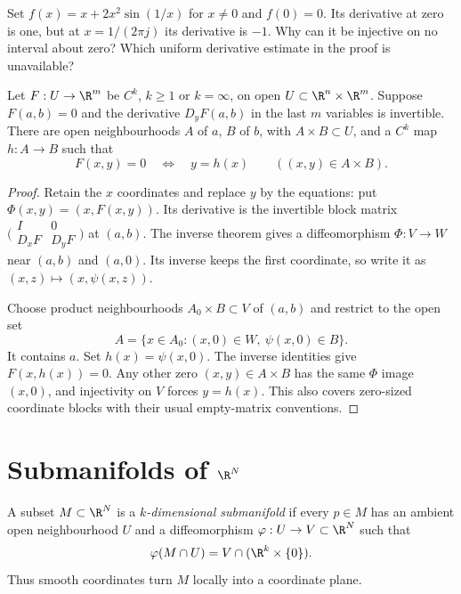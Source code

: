 \begin{think}
Set $f(x)=x+2x^2\sin(1/x)$ for $x\ne0$ and $f(0)=0$. Its derivative at zero is one, but at $x=1/(2\pi j)$ its derivative is $-1$. Why can it be injective on no interval about zero? Which uniform derivative estimate in the proof is unavailable?
\end{think}

\begin{theorem}\label{thm:implicit}
Let $F:U\to\R^m$ be $C^k$, $k\ge1$ or $k=\infty$, on open $U\subset\R^n\times\R^m$. Suppose $F(a,b)=0$ and the derivative $D_yF(a,b)$ in the last $m$ variables is invertible. There are open neighbourhoods $A$ of $a$, $B$ of $b$, with $A\times B\subset U$, and a $C^k$ map $h:A\to B$ such that
\[
F(x,y)=0\quad\Longleftrightarrow\quad y=h(x)\qquad((x,y)\in A\times B).
\]
\end{theorem}
\begin{proof}
Retain the $x$ coordinates and replace $y$ by the equations: put $\Phi(x,y)=(x,F(x,y))$. Its derivative is the invertible block matrix
$\bigl(\begin{smallmatrix}I&0\\D_xF&D_yF\end{smallmatrix}\bigr)$ at $(a,b)$. The inverse theorem gives a diffeomorphism $\Phi:V\to W$ near $(a,b)$ and $(a,0)$. Its inverse keeps the first coordinate, so write it as $(x,z)\mapsto(x,\psi(x,z))$.

Choose product neighbourhoods $A_0\times B\subset V$ of $(a,b)$ and restrict to the open set
\[
A=\{x\in A_0:(x,0)\in W,\ \psi(x,0)\in B\}.
\]
It contains $a$. Set $h(x)=\psi(x,0)$. The inverse identities give $F(x,h(x))=0$. Any other zero $(x,y)\in A\times B$ has the same $\Phi$ image $(x,0)$, and injectivity on $V$ forces $y=h(x)$. This also covers zero-sized coordinate blocks with their usual empty-matrix conventions.
\end{proof}

\section{Submanifolds of \texorpdfstring{$\R^N$}{R\^{}N}}\label{sec:submanifolds}

\begin{definition}
A subset $M\subset\R^N$ is a \emph{$k$-dimensional submanifold} if every $p\in M$ has an ambient open neighbourhood $U$ and a diffeomorphism $\varphi:U\to V\subset\R^N$ such that
\[
\varphi(M\cap U)=V\cap(\R^k\times\{0\}).
\]
Thus smooth coordinates turn $M$ locally into a coordinate plane.
\end{definition}

